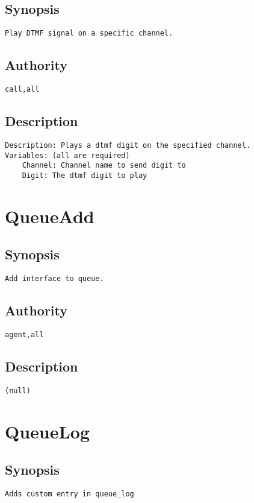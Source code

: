 \subsection{Synopsis}
\begin{verbatim}
Play DTMF signal on a specific channel.
\end{verbatim}
\subsection{Authority}
\begin{verbatim}
call,all
\end{verbatim}
\subsection{Description}
\begin{verbatim}
Description: Plays a dtmf digit on the specified channel.
Variables: (all are required)
	Channel: Channel name to send digit to
	Digit: The dtmf digit to play

\end{verbatim}


\section{QueueAdd}
\subsection{Synopsis}
\begin{verbatim}
Add interface to queue.
\end{verbatim}
\subsection{Authority}
\begin{verbatim}
agent,all
\end{verbatim}
\subsection{Description}
\begin{verbatim}
(null)
\end{verbatim}


\section{QueueLog}
\subsection{Synopsis}
\begin{verbatim}
Adds custom entry in queue_log
\end{verbatim}
